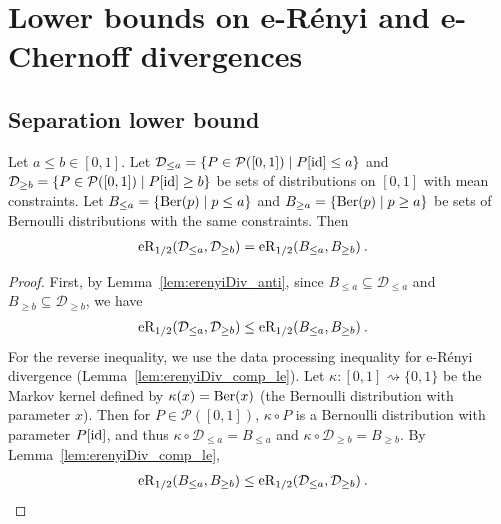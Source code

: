 \chapter{Lower bounds on e-Rényi and e-Chernoff divergences}


\section{Separation lower bound}
\label{sec:separation_lower_bound}


\begin{lemma}\label{lem:erenyiDiv_bounded_eq_erenyiDiv_bernoulli}
  \leanok
Let $a \le b \in [0,1]$.
Let $\mathcal{D}_{\le a} = \{P \in \mathcal{P}([0,1]) \mid P[\operatorname{id}] \le a\}$ and $\mathcal{D}_{\ge b} = \{P \in \mathcal{P}([0,1]) \mid P[\operatorname{id}] \ge b\}$ be sets of distributions on $[0,1]$ with mean constraints.
Let $B_{\le a} = \{\operatorname{Ber}(p) \mid p \le a\}$ and $B_{\ge a} = \{\operatorname{Ber}(p) \mid p \ge a\}$ be sets of Bernoulli distributions with the same constraints.
Then
\begin{align*}
  \operatorname{eR}_{1/2}(\mathcal{D}_{\le a}, \mathcal{D}_{\ge b})
  &= \operatorname{eR}_{1/2}(B_{\le a}, B_{\ge b})
  \: .
\end{align*}
\end{lemma}

\begin{proof}\leanok
First, by Lemma~\ref{lem:erenyiDiv_anti}, since $B_{\le a} \subseteq \mathcal{D}_{\le a}$ and $B_{\ge b} \subseteq \mathcal{D}_{\ge b}$, we have
\begin{align*}
  \operatorname{eR}_{1/2}(\mathcal{D}_{\le a}, \mathcal{D}_{\ge b})
  &\le \operatorname{eR}_{1/2}(B_{\le a}, B_{\ge b})
  \: .
\end{align*}
For the reverse inequality, we use the data processing inequality for e-Rényi divergence (Lemma~\ref{lem:erenyiDiv_comp_le}).
Let $\kappa : [0,1] \rightsquigarrow \{0,1\}$ be the Markov kernel defined by $\kappa(x) = \operatorname{Ber}(x)$ (the Bernoulli distribution with parameter $x$).
Then for $P \in \mathcal{P}([0, 1])$, $\kappa \circ P$ is a Bernoulli distribution with parameter $P[\operatorname{id}]$, and thus $\kappa \circ \mathcal{D}_{\le a} = B_{\le a}$ and $\kappa \circ \mathcal{D}_{\ge b} = B_{\ge b}$.
By Lemma~\ref{lem:erenyiDiv_comp_le},
\begin{align*}
  \operatorname{eR}_{1/2}(B_{\le a}, B_{\ge b})
  &\le \operatorname{eR}_{1/2}(\mathcal{D}_{\le a}, \mathcal{D}_{\ge b})
  \: .
\end{align*}
\end{proof}



